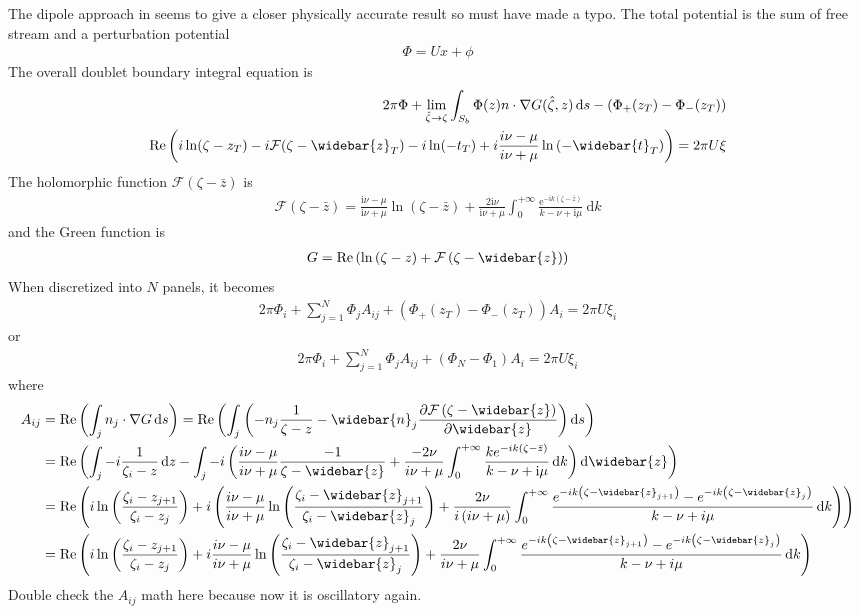 \documentclass[10pt]{article}
\newcommand{\diff}{\mathop{}\!\tn{d}} %
\newcommand{\pp}[2]{\frac{\partial #1}{\partial #2}}
\newcommand{\mcal}[1]{\mathcal{#1}} %
\newcommand{\beq}{\begin{equation}\begin{aligned}}
\newcommand{\eeq}{\end{aligned}\end{equation}}
\newcommand{\tn}[1]{\textrm{#1}}
\renewcommand{\Re}{\operatorname{Re}}
\begin{document}
The dipole approach in \citet{Chen2012a} seems to give a closer physically accurate result so \citet{Chen2012} must have made a typo.
The total potential is the sum of free stream and a perturbation potential
\beq
\Phi = Ux + \phi
\eeq
The overall doublet boundary integral equation is
\beq
2\pi \Phi + \lim_{\hat{\zeta}\rightarrow \zeta} \int_{S_b}^{} \Phi(z) n \cdot \nabla G(\hat{\zeta},z) \diff s
- \left(\Phi_+(z_T) - \Phi_-(z_T)\right)
\\
\Re\left(i\ln (\zeta - z_T) - i \mcal{F}(\zeta - \widebar{z}_T)
-i \ln(-t_T)
+ i \frac{i\nu - \mu}{i\nu + \mu} \ln\left(-\widebar{t}_T\right)
\right)
=
2\pi U \xi
\eeq
The holomorphic function $\mcal{F}(\zeta-\bar{z})$ is
\beq
\mathcal{F}(\zeta-\bar{z})
=
\frac{\mathrm{i} \nu-\mu}{\mathrm{i} \nu+\mu} \ln (\zeta-\bar{z})+\frac{2 \mathrm{i} \nu}{\mathrm{i} \nu+\mu}
\int_0^{+\infty} \frac{\mathrm{e}^{-\mathrm{i} k(\zeta-\bar{z})}}{k-\nu+\mathrm{i} \mu} \mathrm{~d} k
\eeq
and the Green function is
\beq
G = \Re\left( \ln \left(\zeta-z\right) + \mcal{F}\left(\zeta-\widebar{z}\right)\right)
\eeq
When discretized into $N$ panels, it becomes
\beq
2\pi \Phi_i + \sum_{j=1}^{N}\Phi_j A_{ij} +
\left(\Phi_+(z_T) - \Phi_-(z_T)\right)A_i
=
2\pi U \xi_i
\eeq
or
\beq
2\pi \Phi_i + \sum_{j=1}^{N}\Phi_j A_{ij} +
\left(\Phi_N - \Phi_1\right)A_i
=
2\pi U \xi_i
\eeq
where
\beq
A_{ij}
&=
\Re\left(
\int_j n_j \cdot \nabla G \diff s
\right)
=
\Re
\left(
\int_{j}^{}
\left(
	-n_j \frac{1}{\zeta-z}
	-\widebar{n}_j
	\pp{\mcal{F}\left(\zeta-\widebar{z} \right)}{\widebar{z}}
	\right)
\diff s
\right)
\\
&=
\Re
\left(
\int_j - i \frac{1}{\zeta_i - z} \diff z
-
\int_j
-i
\left(\frac{i \nu - \mu}{i\nu + \mu}\frac{-1}{\zeta - \widebar{z}}
	+ \frac{- 2 \nu}{i \nu + \mu}
	\int_{0}^{+\infty}
	\frac{ke^{-i k(\zeta - \bar{z})}}{k - \nu+\mathrm{i} \mu}
	\diff k
	\right)
\diff \widebar{z}
\right)
\\
&=
\Re \left(
i\ln\left(\frac{\zeta_i - z_{j+1}}{\zeta_i - z_j}\right)
+
i\left(
	\frac{i\nu - \mu}{i\nu + \mu}
	\ln \left(\frac{\zeta_i - \widebar{z}_{j+1}}{\zeta_i - \widebar{z}_j}
	\right)
	+\frac{2\nu}{i\left(i\nu + \mu\right)}
	\int_{0}^{+\infty}
	\frac{e^{-ik \left(\zeta-\widebar{z}_{j+1}\right)} - e^{-ik \left(\zeta-\widebar{z}_{j}\right)} }{ k-\nu + i\mu } \diff k
	\right)
\right)
\\
&=
\Re \left(
i\ln\left(\frac{\zeta_i - z_{j+1}}{\zeta_i - z_j}\right)
+i\frac{i\nu - \mu}{i\nu + \mu}
\ln \left(\frac{\zeta_i - \widebar{z}_{j+1}}{\zeta_i - \widebar{z}_j}
\right)
+\frac{2\nu}{i\nu + \mu}
\int_{0}^{+\infty}
\frac{e^{-ik \left(\zeta-\widebar{z}_{j+1}\right)} - e^{-ik \left(\zeta-\widebar{z}_{j}\right)} }{ k-\nu + i\mu } \diff k
\right)
\eeq
Double check the $A_{ij}$ math here because now it is oscillatory again.
\end{document}
